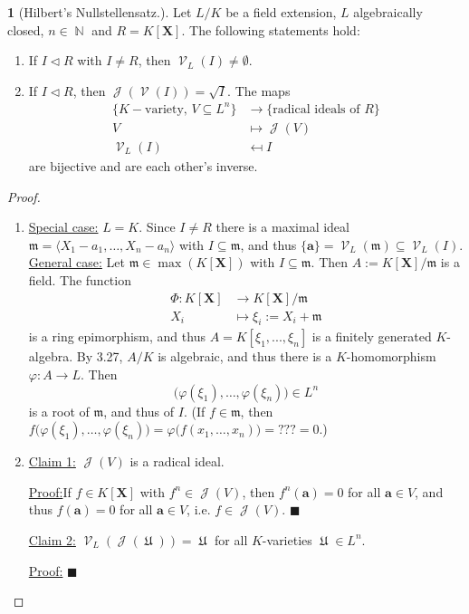 \documentclass[12pt,a4paper]{report}
\theoremstyle{definition}
\theoremstyle{num.custom-title}
\newtheorem{teo_custom-title}[theorem]{} %
\newenvironment{claim}[1]{\par\noindent\underline{Claim#1:}\space}{} %
\newenvironment{claimproof}[1]{\par\noindent\underline{Proof:}\space#1}{\leavevmode\unskip\penalty9999 \hbox{}\nobreak\hfill\quad\hbox{$\blacksquare$}} %
\DeclareMathOperator{\J}{\mathcal{J}}
\DeclareMathOperator{\N}{\mathbb{N}}
\DeclareMathOperator{\U}{\mathfrak{U}}
\DeclareMathOperator{\V}{\mathcal{V}}
\DeclareMathOperator{\sse}{\subseteq}
\newcommand{\m}{\mathfrak{m}}
\newcommand{\X}{\mathbf{X}}
\renewcommand{\phi}{\varphi}
\begin{document}
\begin{teo_custom-title}[Hilbert's Nullstellensatz.]
Let $L/K$ be a field extension, $L$ algebraically closed, $n \in \N$ and $R = K[\X]$. The following statements hold:
\begin{enumerate}
\item If $I \lhd R$ with $I \neq R$, then $\V_L(I) \neq \emptyset$.
\item If $I \lhd R$, then $\J(\V(I)) = \sqrt{I}$. The maps
\begin{align*}
\{ K-\text{variety, } V \sse L^n \} & \to \{ \text{radical ideals of } R \} \\
V & \mapsto \J(V) \\
\V_L(I) & \mapsfrom I
\end{align*}
are bijective and are each other's inverse.
\end{enumerate}
\begin{proof}\ 
\begin{enumerate}
\item \underline{Special case:} $L=K$. Since $I \neq R$ there is a maximal ideal $\m = \langle X_1-a_1, \ldots, X_n-a_n \rangle$ with $I \sse \m$, and thus $\{\mathbf{a}\} = \V_L(\m) \sse \V_L(I)$.\\
\underline{General case:} Let $\m \in \max(K[\X])$ with $I \sse \m$. Then $A := K[\X]/\m$ is a field. The function 
\begin{align*}
\Phi: K[\X] & \to K[\X]/\m \\
X_i & \mapsto \xi_i := X_i + \m
\end{align*}
is a ring epimorphism, and thus $A=K[\xi_1,...,\xi_n]$ is a finitely generated $K$-algebra. By 3.27, $A/K$ is algebraic, and thus there is a $K$-homomorphism $\phi: A \to L$. Then
\[
\Big( \phi(\xi_1), \ldots, \phi(\xi_n) \Big) \in L^n
\]
is a root of $\m$, and thus of $I$. (If $f \in \m$, then $f \Big( \phi(\xi_1), \ldots, \phi(\xi_n) \Big) = \phi \Big(f(x_1, \ldots, x_n) \Big) = ??? = 0$.)
\item 
\begin{claim}{ 1}
$\J(V)$ is a radical ideal.
\begin{claimproof}
If $f \in K[\X]$ with $f^n \in \J(V)$, then $f^n(\mathbf{a})=0$ for all $\mathbf{a} \in V$, and thus $f(\mathbf{a})=0$ for all $\mathbf{a} \in V$, i.e. $f \in \J(V)$.
\end{claimproof}
\end{claim}
\begin{claim}{ 2}
$\V_L(\J(\U))=\U$ for all $K$-varieties $\U \in L^n$.
\begin{claimproof}

\end{claimproof}
\end{claim}
\end{enumerate}
\end{proof}
\end{teo_custom-title}
\end{document}
